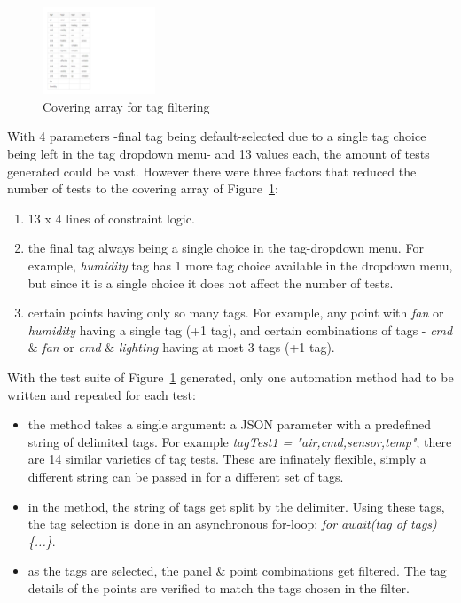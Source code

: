 \documentclass[conference]{IEEEtran}
\begin{document}
	\begin{figure}[!b]
		\centering
		\includegraphics[width=0.30\textwidth,]{tagFilterCoveringArray.pdf}
		\caption{Covering array for tag filtering}
		\label{fig:tagFilterCoveringArray}
	\end{figure}


	With 4 parameters -final tag being default-selected due to a single tag choice being left in the tag dropdown menu- and 13 values each, the amount of tests generated could be vast. 
	However there were three factors that reduced the number of tests to the covering array of Figure~\ref{fig:tagFilterCoveringArray}:
	
	\begin{enumerate}
		\item 13 x 4 lines of constraint logic.
		\item the final tag always being a single choice in the tag-dropdown menu. For example, \textit{humidity} tag has 1 more tag choice available in the dropdown menu, but since it is a single choice it does not affect  the number of tests.
		\item certain points having only so many tags. For example, any point with \textit{fan} or \textit{humidity} having a single tag (+1 tag), and certain combinations of tags - \textit{cmd} \& \textit{fan} or \textit{cmd} \& \textit{lighting} having at most 3 tags (+1 tag).
	\end{enumerate}

	With the test suite of Figure~\ref{fig:tagFilterCoveringArray} generated, only one automation method had to be written and repeated for each test:
	
	\begin{itemize}
		\item the method takes a single argument: a JSON parameter with a predefined string of delimited tags. For example \textit{tagTest1 = "air,cmd,sensor,temp"}; there are 14 similar varieties of tag tests. These are infinately flexible, simply a different string can be passed in for a different set of tags.
		\item in the method, the string of tags get split by the delimiter. Using these tags, the tag selection is done in an asynchronous for-loop: \emph{for await(tag of tags) \{...\}}. 
		\item as the tags are selected, the panel \& point combinations get filtered. The tag details of the points are verified to match the tags chosen in the filter.
	\end{itemize}
	
\end{document}

